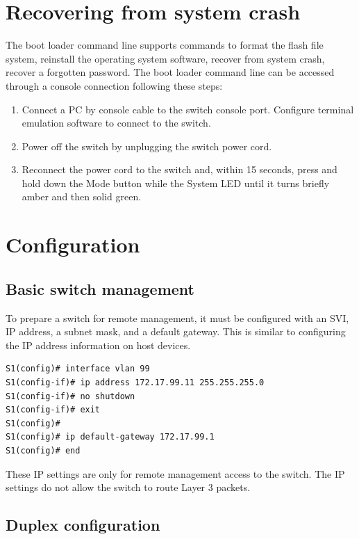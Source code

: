 \section{Recovering from system crash}

The boot loader command line supports commands to format the flash file system, reinstall the operating system software, recover from system crash, recover a forgotten password. The boot loader command line can be accessed through a console connection following these steps:

\begin{enumerate}
\item Connect a PC by console cable to the switch console port. Configure terminal emulation software to connect to the switch.

\item Power off the switch by unplugging the switch power cord.

\item Reconnect the power cord to the switch and, within 15 seconds, press and hold down the Mode button while the System LED until it turns briefly amber and then solid green.
\end{enumerate}

\section{Configuration}

\subsection{Basic switch management}

To prepare a switch for remote management, it must be configured with an SVI, IP address, a subnet mask, and a default gateway. This is similar to configuring the IP address information on host devices.\\

\begin{verbatim}
S1(config)# interface vlan 99
S1(config-if)# ip address 172.17.99.11 255.255.255.0
S1(config-if)# no shutdown
S1(config-if)# exit
S1(config)#
S1(config)# ip default-gateway 172.17.99.1
S1(config)# end
\end{verbatim}

\note These IP settings are only for remote management access to the switch. The IP settings do not allow the switch to route Layer 3 packets.

\subsection{Duplex configuration}

